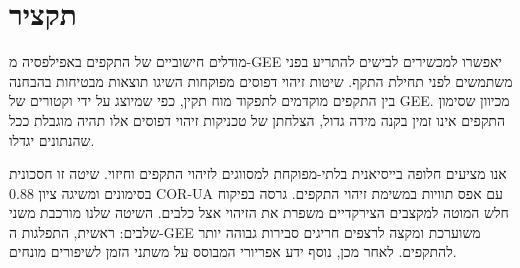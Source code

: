 \chapter*{תקציר}


מודלים חישוביים של התקפים באפילפסיה מ-GEE יאפשרו למכשירים לבישים להתריע בפני משתמשים לפני תחילת התקף. שיטות זיהוי דפוסים מפוקחות השיגו תוצאות מבטיחות בהבחנה בין התקפים מוקדמים לתפקוד מוח תקין, כפי שמיוצג על ידי וקטורים של GEE. מכיוון שסימון התקפים אינו זמין בקנה מידה גדול, הצלחתן של טכניקות זיהוי דפוסים אלו תהיה מוגבלת ככל שהנתונים יגדלו.

אנו מציעים חלופה בייסיאנית בלתי-מפוקחת למסווגים לזיהוי התקפים וחיזוי. שיטה זו חסכונית בסימונים ומשיגה ציון 0.88 COR-UA עם אפס תוויות במשימת זיהוי התקפים. גרסה בפיקוח חלש המוטה למקצבים הצירקדיים משפרת את הזיהוי אצל כלבים. השיטה שלנו מורכבת משני שלבים: ראשית, התפלגות ה-GEE משוערכת ומקצה לרצפים חריגים סבירות גבוהה יותר להתקפים. לאחר מכן, נוסף ידע אפריורי המבוסס על משתני הזמן לשיפורים מונחים.